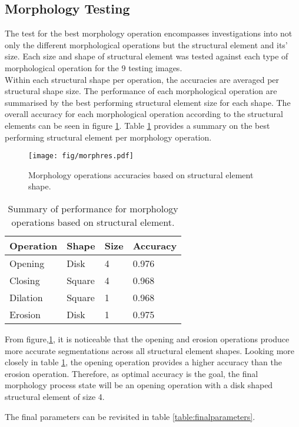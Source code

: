 \subsection{Morphology Testing} 
The test for the best morphology operation encompasses investigations into not only the different morphological operations but the structural element and its' size. Each size and shape of structural element was tested against each type of morphological operation for the 9 testing images. 
\\[1\baselineskip]
Within each structural shape per operation, the accuracies are averaged per structural shape size. The performance of each morphological operation are summarised by the best performing structural element size for each shape. The overall accuracy for each morphological operation according to the structural elements can be seen in figure \ref{fig:morphres}. Table \ref{table:morphres} provides a summary on the best performing structural element per morphology operation.

\begin{figure}[H]
\centering
\texttt{[image: fig/morphres.pdf]}
\caption{Morphology operations accuracies based on structural element shape.}
\label{fig:morphres}
\end{figure}

\begin{table}[H]
\centering
\caption{Summary of performance for morphology operations based on structural element.}

\begin{tabular}{|l|l|l|l|}
\hline
\textbf{Operation} &	\textbf{Shape} & \textbf{Size} & \textbf{Accuracy}\\
\hline
Opening & Disk  & 4  & 0.976\\
\hline				    	 			
Closing & Square & 4  & 0.968\\	
\hline
Dilation & Square & 1 & 0.968\\
\hline
Erosion & Disk & 1 & 0.975\\		    	 
\hline 
\end{tabular}
\label{table:morphres}
\end{table}

From figure,\ref{fig:morphres}, it is noticeable that the opening and erosion operations produce more accurate segmentations across all structural element shapes. Looking more closely in table \ref{table:morphres}, the opening operation provides a higher accuracy than the erosion operation. Therefore, as optimal accuracy is the goal, the final morphology process state will be an opening operation with a disk shaped structural element of size 4.

The final parameters can be revisited in table \ref{table:finalparameters}.

